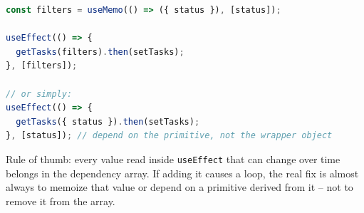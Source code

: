 \begin{lstlisting}[language=JavaScript]
const filters = useMemo(() => ({ status }), [status]);

useEffect(() => {
  getTasks(filters).then(setTasks);
}, [filters]);

// or simply:
useEffect(() => {
  getTasks({ status }).then(setTasks);
}, [status]); // depend on the primitive, not the wrapper object
\end{lstlisting}

\begin{tipbox}[TIP]
Rule of thumb: every value read inside \texttt{useEffect} that can change over
time belongs in the dependency array. If adding it causes a loop, the real
fix is almost always to memoize that value or depend on a primitive
derived from it -- not to remove it from the array.
\end{tipbox}

